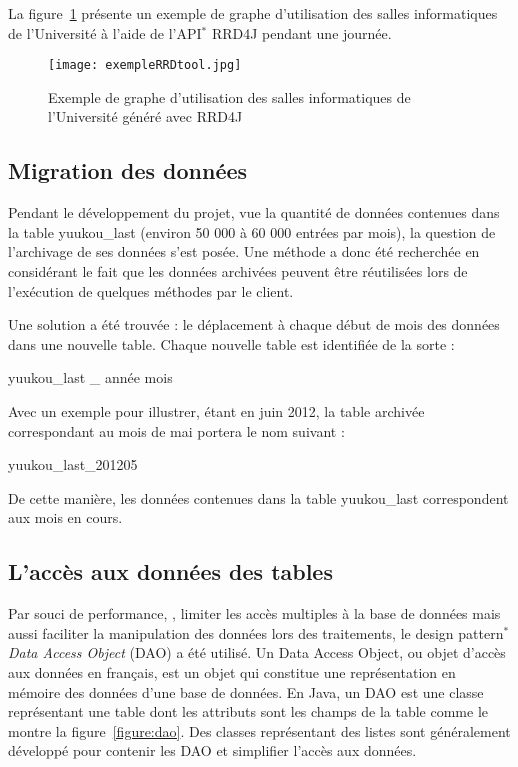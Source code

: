 La figure~\ref{figure:rrdTool} pr\'esente un exemple de graphe d'utilisation des salles informatiques de l'Universit\'e \`a l'aide de l'API$^*$ RRD4J pendant une journ\'ee.

\begin{figure}[!ht]
	\centering
	\texttt{[image: exempleRRDtool.jpg]}
	\caption{Exemple de graphe d'utilisation des salles informatiques de l'Universit\'e g\'en\'er\'e avec RRD4J}
	\label{figure:rrdTool}

\end{figure}

\subsection{Migration des donn\'ees}
\label{section:migrationDonnees}

Pendant le d\'eveloppement du projet, vue la quantit\'e de donn\'ees contenues dans la table \textsf{yuukou\_last} (environ 50 000 \`a 60 000 entr\'ees par mois), la question de l'archivage de ses donn\'ees s'est pos\'ee.
Une m\'ethode a donc \'et\'e recherch\'ee en consid\'erant le fait que les donn\'ees archiv\'ees peuvent \^etre r\'eutilis\'ees lors de l'ex\'ecution de quelques m\'ethodes par le client.

Une solution a \'et\'e trouv\'ee : le d\'eplacement \`a chaque d\'ebut de mois des donn\'ees dans une nouvelle table.
Chaque nouvelle table est identifi\'ee de la sorte : 

\begin{center}
	\textsf{yuukou\_last \_ ann\'ee mois}

\end{center}

Avec un exemple pour illustrer, \'etant en juin 2012, la table archiv\'ee correspondant au mois de mai portera le nom suivant : 

\begin{center}
	\textsf{yuukou\_last\_201205}

\end{center}

De cette mani\`ere, les donn\'ees contenues dans la table \textsf{yuukou\_last} correspondent aux mois en cours.

\subsection{L'acc\`es aux donn\'ees des tables}

Par souci de performance, \cad, limiter les acc\`es multiples \`a la base de donn\'ees mais aussi faciliter la manipulation des donn\'ees lors des traitements, le design pattern$^*$ \textit{Data Access Object} (DAO) a \'et\'e utilis\'e.
Un Data Access Object, ou objet d'acc\`es aux donn\'ees en fran\c{c}ais, est un objet qui constitue une repr\'esentation en m\'emoire des donn\'ees d'une base de donn\'ees.
En Java, un DAO est une classe repr\'esentant une table dont les attributs sont les champs de la table comme le montre la figure~\ref{figure:dao}.
Des classes repr\'esentant des listes sont g\'en\'eralement d\'evelopp\'e pour contenir les DAO et simplifier l'acc\`es aux donn\'ees.

